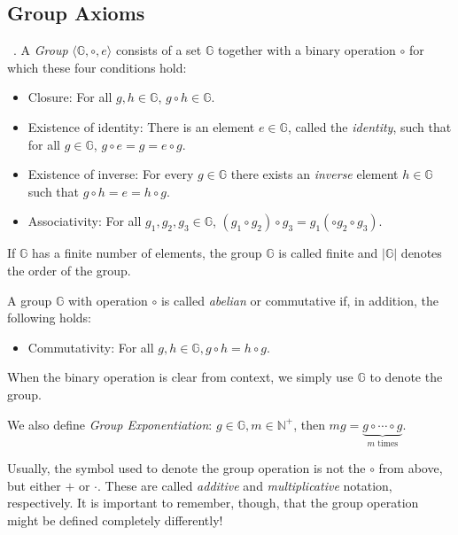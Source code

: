 \subsection{Group Axioms}\label{sec:group}
\begin{definition}~\cite{katz_introduction_2015}. A \emph{Group} $\langle \mathbb{G}, \circ, e \rangle$ consists of a set $\mathbb{G}$ together with a binary operation $\circ$ for which these four conditions hold:
    \begin{itemize}
        \item Closure: For all $g, h \in \mathbb{G}$, $g \circ h \in \mathbb{G}$.
        \item Existence of identity: There is an element $e \in \mathbb{G}$, called the \emph{identity}, such that for all $g \in \mathbb{G}$, $g \circ e = g = e \circ g$.
        \item Existence of inverse: For every $g \in \mathbb{G}$ there exists an \emph{inverse} element $h \in \mathbb{G}$ such that $g \circ h = e = h \circ g$.
        \item Associativity: For all $g_1, g_2, g_3 \in \mathbb{G}$, $(g_1 \circ g_2) \circ g_3 = g_1 (\circ g_2 \circ g_3)$.
    \end{itemize}
    If $\mathbb{G}$ has a finite number of elements, the group $\mathbb{G}$ is called finite and $|\mathbb{G}|$ denotes the order of the group.

    A group $\mathbb{G}$ with operation $\circ$ is called \emph{abelian} or commutative if, in addition, the following holds:
    \begin{itemize}
        \item Commutativity: For all $g, h \in \mathbb{G}, g \circ h = h \circ g$.
    \end{itemize}

    When the binary operation is clear from context, we simply use $\mathbb{G}$ to denote the group.

    We also define \emph{Group Exponentiation}: $g \in \mathbb{G}, m \in \mathbb{N}^+$, then $mg = \underbrace{g \circ \cdots \circ g}_{m \text{ times}}$.
\end{definition}


Usually, the symbol used to denote the group operation is not the $\circ$ from above, but either $+$ or $\cdot$. These are called \emph{additive} and \emph{multiplicative} notation, respectively.
It is important to remember, though, that the group operation might be defined completely differently!

